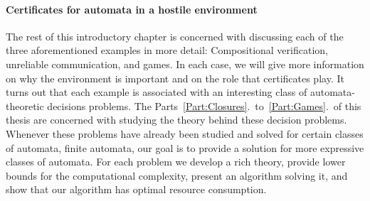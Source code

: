 \documentclass[../../diss.tex]{subfiles}
\begin{document}
\paragraph{Certificates for automata in a hostile environment}

The rest of this introductory chapter is concerned with discussing each of the three aforementioned examples in more detail:
Compositional verification, unreliable communication, and games.
In each case, we will give more information on why the environment is important and on the role that certificates play.
It turns out that each example is associated with an interesting class of automata-theoretic decisions problems.
The Parts~\ref{Part:Closures}.~to~\ref{Part:Games}.~of this thesis are concerned with studying the theory behind these decision problems.
Whenever these problems have already been studied and solved for certain classes of automata, \eg finite automata, our goal is to provide a solution for more expressive classes of automata.
For each problem
we develop a rich theory,
provide lower bounds for the computational complexity,
present an algorithm solving it,
and show that our algorithm has optimal resource consumption.
\end{document}
